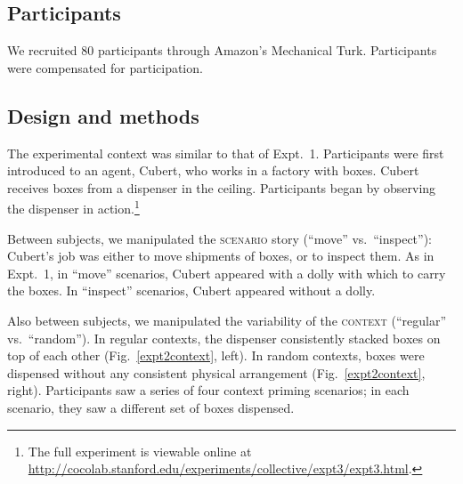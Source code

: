 \documentclass[linguex]{sp}
\newcommand{\ndg}[1]{\textcolor{Green}{[ndg: #1]}}
\begin{document}
\subsection{Participants}

We recruited 80 participants through Amazon's Mechanical Turk. Participants were compensated for participation.

\subsection{Design and methods}

The experimental context was similar to that of Expt.~1. Participants were first introduced to an agent, Cubert, who works in a factory with boxes. Cubert receives boxes from a dispenser in the ceiling. Participants began by observing the dispenser in action.\footnote{The full experiment is viewable online at \url{http://cocolab.stanford.edu/experiments/collective/expt3/expt3.html}.} 

Between subjects, we manipulated the \textsc{scenario} story (``move'' vs.~``inspect''): Cubert's job was either to move shipments of boxes, or to inspect them. As in Expt.~1, in ``move'' scenarios, Cubert appeared with a dolly with which to carry the boxes. In ``inspect'' scenarios, Cubert appeared without a dolly.

Also between subjects, we manipulated the variability of the \textsc{context} (``regular'' vs.~``random''). In regular contexts, the dispenser consistently stacked boxes on top of each other (Fig.~\ref{expt2context}, left). In random contexts, boxes were dispensed without any consistent physical arrangement (Fig.\ \ref{expt2context}, right). Participants saw a series of four context priming scenarios; in each scenario, they saw a different set of boxes dispensed.
\end{document}
